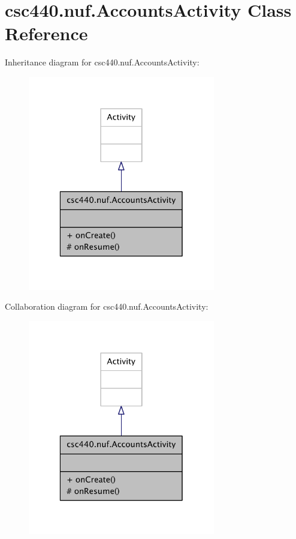 \hypertarget{classcsc440_1_1nuf_1_1_accounts_activity}{\section{csc440.\-nuf.\-Accounts\-Activity Class Reference}
\label{classcsc440_1_1nuf_1_1_accounts_activity}
}


Inheritance diagram for csc440.\-nuf.\-Accounts\-Activity\-:
\nopagebreak
\begin{figure}[H]
\begin{center}
\leavevmode
\includegraphics[width=232pt]{classcsc440_1_1nuf_1_1_accounts_activity__inherit__graph}
\end{center}
\end{figure}


Collaboration diagram for csc440.\-nuf.\-Accounts\-Activity\-:
\nopagebreak
\begin{figure}[H]
\begin{center}
\leavevmode
\includegraphics[width=232pt]{classcsc440_1_1nuf_1_1_accounts_activity__coll__graph}
\end{center}
\end{figure}
